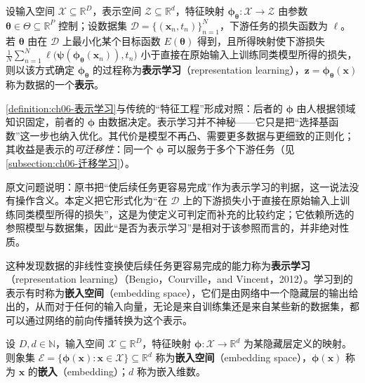 \documentclass[../../main.tex]{subfiles}
\begin{document}
\begin{definition}[表示学习]\label{definition:ch06-表示学习}
设输入空间 $\mathcal{X}\subseteq\mathbb{R}^{D}$，表示空间 $\mathcal{Z}\subseteq\mathbb{R}^{d}$，特征映射 $\boldsymbol{\phi}_{\boldsymbol{\theta}}:\mathcal{X}\to\mathcal{Z}$ 由参数 $\boldsymbol{\theta}\in\Theta\subseteq\mathbb{R}^{P}$ 控制；设数据集 $\mathcal{D}=\{(\boldsymbol{x}_{n},t_{n})\}_{n=1}^{N}$，下游任务的损失函数为 $\ell$。若 $\boldsymbol{\theta}$ 由在 $\mathcal{D}$ 上最小化某个目标函数 $E(\boldsymbol{\theta})$ 得到，且所得映射使下游损失 $\frac{1}{N}\sum_{n=1}^{N}\ell\bigl(\boldsymbol{\psi}(\boldsymbol{\phi}_{\boldsymbol{\theta}}(\boldsymbol{x}_{n})),t_{n}\bigr)$ 小于直接在原始输入上训练同类模型所得的损失，则以该方式确定 $\boldsymbol{\phi}_{\boldsymbol{\theta}}$ 的过程称为\textbf{表示学习}（representation learning），$\boldsymbol{z}=\boldsymbol{\phi}_{\boldsymbol{\theta}}(\boldsymbol{x})$ 称为数据的一个\textbf{表示}。
\end{definition}

\begin{remark}\cref{definition:ch06-表示学习}与传统的“特征工程”形成对照：后者的 $\boldsymbol{\phi}$ 由人根据领域知识固定，前者的 $\boldsymbol{\phi}$ 由数据决定。表示学习并不神秘——它只是把“选择基函数”这一步也纳入优化。其代价是模型不再凸、需要更多数据与更细致的正则化；其收益是表示的\emph{可迁移性}：同一个 $\boldsymbol{\phi}$ 可以服务于多个下游任务（见\cref{subsection:ch06-迁移学习}）。

原文问题说明：原书把“使后续任务更容易完成”作为表示学习的判据，这一说法没有操作含义。本定义把它形式化为“在 $\mathcal{D}$ 上的下游损失小于直接在原始输入上训练同类模型所得的损失”，这是为使定义可判定而补充的比较约定；它依赖所选的参照模型与数据集，因此“是否为表示学习”是相对于该参照而言的，并非绝对性质。
\end{remark}

这种发现数据的非线性变换使后续任务更容易完成的能力称为\textbf{表示学习}（representation learning）（Bengio，Courville，and Vincent，2012）。学习到的表示有时称为\textbf{嵌入空间}（embedding space），它们是由网络中一个隐藏层的输出给出的，从而对于任何的输入向量，无论是来自训练集还是来自某些新的数据集，都可以通过网络的前向传播转换为这个表示。

\begin{definition}[嵌入空间]\label{definition:ch06-嵌入空间}
设 $D,d\in\mathbb{N}$，输入空间 $\mathcal{X}\subseteq\mathbb{R}^{D}$，特征映射 $\boldsymbol{\phi}:\mathcal{X}\to\mathbb{R}^{d}$ 为某隐藏层定义的映射。则象集 $\mathcal{E}=\{\boldsymbol{\phi}(\boldsymbol{x}):\boldsymbol{x}\in\mathcal{X}\}\subseteq\mathbb{R}^{d}$ 称为\textbf{嵌入空间}（embedding space），$\boldsymbol{\phi}(\boldsymbol{x})$ 称为 $\boldsymbol{x}$ 的\textbf{嵌入}（embedding）；$d$ 称为嵌入维数。
\end{definition}
\end{document}
